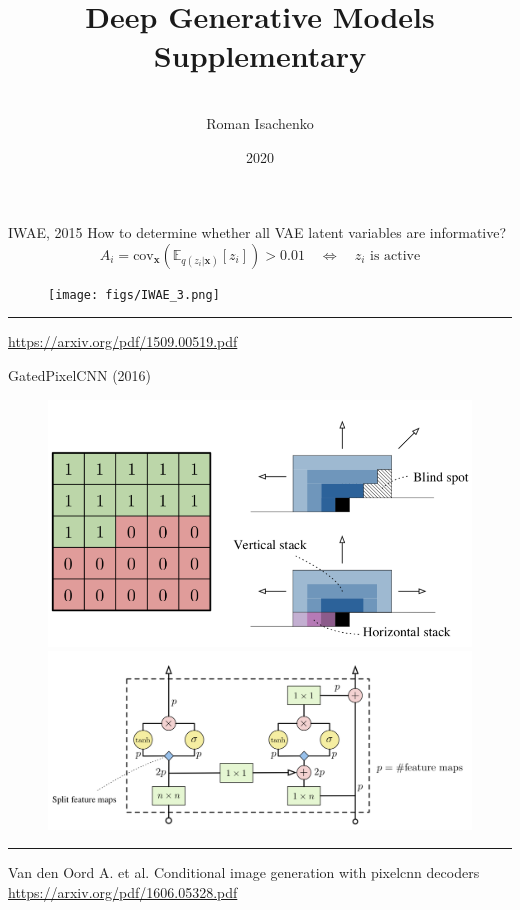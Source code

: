 \documentclass{beamer}
\title[\hbox to 56mm{Deep Generative Models  \hfill\insertframenumber\,/\,\inserttotalframenumber}]
{Deep Generative Models \\ Supplementary}
\author[Roman Isachenko]{\\Roman Isachenko}
\institute[MIPT]{Moscow Institute of Physics and Technology \\
}
\date{2020}
\newcommand{\bx}{\mathbf{x}}
\begin{document}
\begin{frame}
\titlepage
\end{frame}
\begin{frame}{IWAE, 2015}
How to determine whether all VAE latent variables are informative?
\[
A_{i} = \text{cov}_\bx \left( \mathbb{E}_{q(z_i | \bx)} [z_i] \right) > 0.01 \quad \Leftrightarrow \quad z_i \text{ is active}
\]
\begin{figure}
	\centering
	\texttt{[image: figs/IWAE\_3.png]}
\end{figure}
\vfill
\hrule\medskip
{\scriptsize \href{https://arxiv.org/pdf/1509.00519.pdf}{https://arxiv.org/pdf/1509.00519.pdf}}
\end{frame}
 \begin{frame}{GatedPixelCNN (2016)}
 \begin{figure}
     \centering
     \includegraphics[width=0.5\linewidth]{figs/gatedpixelcnn.png}
     \includegraphics[width=0.5\linewidth]{figs/gated_block.png}
 \end{figure}
 \vfill
 \hrule\medskip
 {\scriptsize Van den Oord A. et al. Conditional image generation with pixelcnn decoders \href{https://arxiv.org/pdf/1606.05328.pdf}{https://arxiv.org/pdf/1606.05328.pdf}}
 \end{frame}
\end{document}

